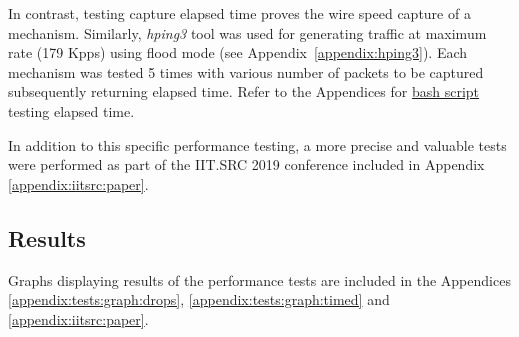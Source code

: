 \documentclass[12pt,a4paper,twoside]{report}
\begin{document}
			In contrast, testing capture elapsed time proves the wire speed capture of a mechanism. Similarly, \emph{hping3} tool was used for generating traffic at maximum rate (179 Kpps) using flood mode (see Appendix~\ref{appendix:hping3}). Each mechanism was tested 5 times with various number of packets to be captured subsequently returning elapsed time. Refer to the Appendices for \hyperref[appendix:script:timed]{bash script} testing elapsed time.\par
			In addition to this specific performance testing, a more precise and valuable tests were performed as part of the IIT.SRC 2019 conference included in Appendix \ref{appendix:iitsrc:paper}.
		\subsection{Results} \label{analysis:testing:results}
			Graphs displaying results of the performance tests are included in the Appendices \ref{appendix:tests:graph:drops}, \ref{appendix:tests:graph:timed} and \ref{appendix:iitsrc:paper}.
\end{document}
